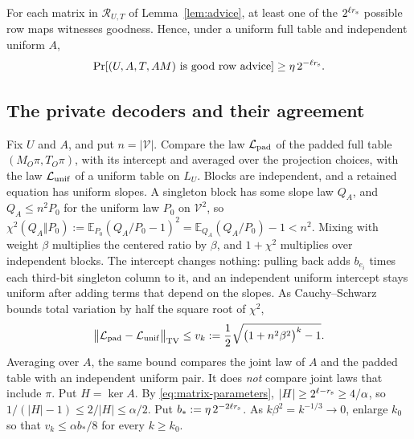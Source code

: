 \documentclass[11pt]{article}
\newcommand{\E}{\mathbb E}
\begin{document}
\noindent For each matrix in $\mathcal R_{U,T}$ of Lemma~\ref{lem:advice}, at least one
of the $2^{\ell r_{\rm s}}$ possible row maps witnesses goodness. Hence,
under a uniform full table and independent uniform $A$,
\begin{equation}\label{eq:good-advice}
 \Pr[(U,A,T,AM)\text{ is good row advice}]
 \ge\eta\,2^{-\ell r_{\rm s}}.
\end{equation}
\subsection{The private decoders and their agreement}\label{sec:decoder}

Fix $U$ and $A$, and put $n=|\mathcal V|$. Compare the law
$\mathcal L_{\rm pad}$ of the padded full table $(M_O\pi,T_O\pi)$, with its
intercept and averaged over the projection choices, with the law
$\mathcal L_{\rm unif}$ of a uniform table on $L_U$. Blocks are independent,
and a retained equation has uniform slopes. A singleton block has some
slope law $Q_A$, and $Q_A\le n^2P_0$ for the uniform law $P_0$ on
$\mathcal V^2$, so
$\chi^2(Q_A\Vert P_0):=\E_{P_0}(Q_A/P_0-1)^2=\E_{Q_A}(Q_A/P_0)-1<n^2$.
Mixing with weight $\beta$ multiplies the centered ratio by $\beta$, and
$1+\chi^2$ multiplies over independent blocks. The intercept changes
nothing: pulling back adds $b_{e_i}$ times each third-bit singleton column
to it, and an independent uniform intercept stays uniform after adding
terms that depend on the slopes. As Cauchy--Schwarz bounds total
variation by half the square root of $\chi^2$,
\begin{equation}\label{eq:tv}
 \bigl\|\mathcal L_{\rm pad}-\mathcal L_{\rm unif}\bigr\|_{\rm TV}
 \le v_k:=\frac12\sqrt{\bigl(1+n^2\beta^2\bigr)^k-1}.
\end{equation}
Averaging over $A$, the same bound compares the joint law of $A$ and the
padded table with an independent uniform pair. It does \emph{not}
compare joint laws that include $\pi$.
Put $H=\ker A$. By \eqref{eq:matrix-parameters}, $|H|\ge2^{\ell-r_{\rm s}}\ge4/\alpha$,
so $1/(|H|-1)\le2/|H|\le\alpha/2$. Put $b_*:=\eta\,2^{-2\ell r_{\rm s}}$. As
$k\beta^2=k^{-1/3}\to0$, enlarge $k_0$ so that $v_k\le\alpha b_*/8$ for
every $k\ge k_0$.
\end{document}
